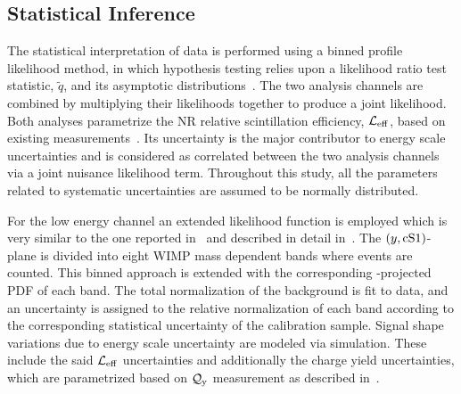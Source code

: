 
\subsection{Statistical Inference}
\label{sec:LikelihoodFunction}
The statistical interpretation of data is performed using a binned profile likelihood method, in which hypothesis testing relies upon a likelihood ratio test statistic, $\tilde{q}$, 
and its asymptotic distributions~\cite{asympt}. The two analysis channels are combined by multiplying their likelihoods together to produce a joint likelihood. 
Both analyses parametrize the NR relative scintillation efficiency, $\mathcal{L}_{\mathrm{eff}}$, based on existing measurements~\cite{run8Result}. Its uncertainty is the major contributor to energy scale uncertainties and is considered as correlated between the two analysis channels via a joint nuisance likelihood term.
Throughout this study, all the parameters related to systematic uncertainties are assumed to be normally distributed.

For the low energy channel an extended likelihood function is employed which is very similar to the one reported in~\cite{Aprile:2011hx} and described in detail in~\cite{xe100_run_combination}. 
The $(y,\mathrm{cS1}{})$-plane is divided into eight WIMP mass dependent bands where events are counted. This binned approach is extended with the corresponding \cSi{}-projected PDF of each band. The total normalization of the background is fit to data, and an uncertainty is assigned to the relative normalization of each band according to the corresponding statistical uncertainty of the calibration sample.
Signal shape variations due to energy scale uncertainty are modeled via simulation. These include  the said $\mathcal{L}_{\mathrm{eff}}$ uncertainties and additionally 
the charge yield uncertainties, which are parametrized based on $\mathcal{Q}_{\mathrm{y}}$ measurement as described in~\cite{DataMCXenon}.

